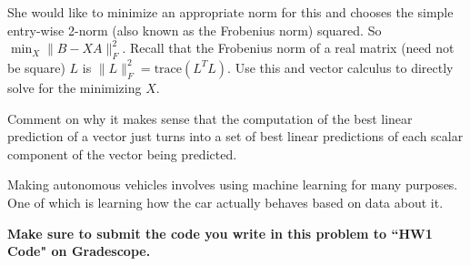 \documentclass[11pt]{article}
\begin{document}
\begin{Parts}
She would like to minimize an appropriate norm for this and chooses
the simple entry-wise 2-norm (also known as the Frobenius norm)
squared. So $\min_{X} \| B - X A \|_{F}^2$. Recall that the Frobenius
norm of a real matrix (need not be square) $L$ is $\|L\|_{F}^2 =
\mbox{trace}(L^T L)$. Use this and vector calculus to directly solve
for the minimizing $X$. 



\Part Comment on why it makes sense that the computation of the best
linear prediction of a vector just turns into a set of best linear
predictions of each scalar component of the vector being predicted.



\end{Parts}



Making autonomous vehicles involves using machine learning for many
purposes. One of which is learning how the car actually behaves based
on data about it.

\textbf{Make sure to submit the code you write in this problem to ``HW1 Code" on Gradescope.}
\end{document}
